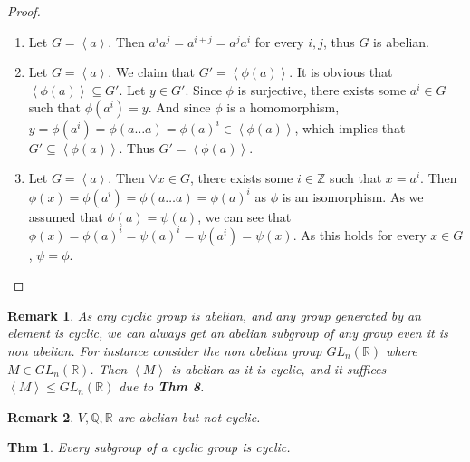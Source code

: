 \documentclass[paper=a4, fontsize=11pt]{scrartcl}
\newcommand{\cyc}[1]{\left< #1 \right>}
\newcommand{\nextline}{$ $ \newline \vspace{-0.15in}}
\newtheorem{theorem}{Thm}
\newtheorem*{remark}{Remark}
\begin{document}
\begin{proof}
\nextline
\begin{enumerate}
	\item Let $G=\cyc{a}$. Then $a^i a^j = a^{i+j} = a^j a^i$ for every $i,j$, thus $G$ is abelian.
	\item Let $G=\cyc{a}$. We claim that $G'=\cyc{\phi(a)}$. It is obvious that $\cyc{\phi(a)}\subseteq G'$. Let $y\in G'$. Since $\phi$ is surjective, there exists some $a^i \in G$ such that $\phi(a^i)=y$. And since $\phi$ is a homomorphism, $y=\phi(a^i)=\phi(a\dots a)=\phi(a)^i \in \cyc{\phi(a)}$, which implies that $G'\subseteq\cyc{\phi(a)}$. Thus $G'=\cyc{\phi(a)}$.
	\item Let $G=\cyc{a}$. Then $\forall x \in G$, there exists some $i \in \mathbb{Z}$ such that $x=a^i$. Then $\phi(x)=\phi(a^i)=\phi(a\dots a)=\phi(a)^i$ as $\phi$ is an isomorphism. As we assumed that $\phi(a)=\psi(a)$, we can see that $\phi(x)=\phi(a)^i=\psi(a)^i=\psi(a^i)=\psi(x)$. As this holds for every $x \in G$, $\psi=\phi$.
\end{enumerate}
\end{proof}

\begin{remark}
	As any cyclic group is abelian, and any group generated by an element is cyclic, we can always get an abelian subgroup of any group even it is non abelian. For instance consider the non abelian group $GL_n(\mathbb{R})$ where $M\in GL_n(\mathbb{R})$. Then $\cyc{M}$ is abelian as it is cyclic, and it suffices $\cyc{M}\leqslant GL_n(\mathbb{R})$ due to \textbf{Thm 8}.\\
\end{remark}


\begin{remark}
	$V,\mathbb{Q},\mathbb{R}$ are abelian but not cyclic.\\
\end{remark}

\begin{theorem}
	Every subgroup of a cyclic group is cyclic.\\
\end{theorem}
\end{document}
